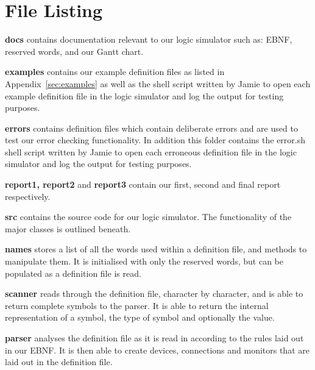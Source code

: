 \documentclass[a4paper,10pt]{article}
\begin{document}
\clearpage
\section{File Listing}


\setlength{\DTbaselineskip}{15pt}
\DTsetlength{.2em}{3em}{0.1em}{1pt}{4pt}

\textbf{docs} contains documentation relevant to our logic simulator such as: EBNF, reserved words, and our Gantt chart.

\textbf{examples} contains our example definition files as listed in Appendix~\ref{sec:examples} as well as the shell script written by Jamie to open each example definition file in the logic simulator and log the output for testing purposes.

\textbf{errors} contains definition files which contain deliberate errors and are used to test our error checking functionality. In addition this folder contains the error.sh shell script written by Jamie to open each erroneous definition file in the logic simulator and log the output for testing purposes.

\textbf{report1, report2} and \textbf{report3} contain our first, second and final report respectively.

\textbf{src} contains the source code for our logic simulator. The functionality of the major classes is outlined beneath.

\textbf{names} stores a list of all the words used within a definition file, and methods to manipulate them. It is initialised with only the reserved words, but can be populated as a definition file is read.

\textbf{scanner} reads through the definition file, character by character, and is able to return complete symbols to the parser. It is able to return the internal representation of a symbol, the type of symbol and optionally the value.

\textbf{parser} analyses the definition file as it is read in according to the rules laid out in our EBNF. It is then able to create devices, connections and monitors that are laid out in the definition file.
\end{document}
